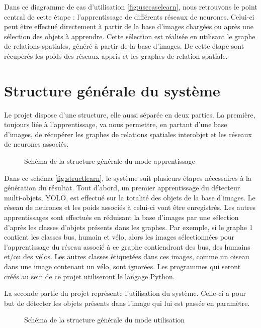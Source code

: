 \documentclass[debug,nodate,hideweeklyreports]{polytech/polytech}
\begin{document}
Dans ce diagramme de cas d’utilisation \autoref{fig:usecaselearn}, nous retrouvons le point central de cette étape : l’apprentissage de différents réseaux de neurones. Celui-ci peut être effectué directement à partir de la base d’images chargées ou après une sélection des objets à apprendre. Cette sélection est réalisée en utilisant le graphe de relations spatiales, généré à partir de la base d’images. De cette étape sont récupérés les poids des réseaux appris et les graphes de relation spatiale.

\section{Structure générale du système}

Le projet dispose d’une structure, elle aussi séparée en deux parties.
La première, toujours liée à l’apprentissage, va nous permettre, en partant d’une base d’images, de récupérer les graphes de relations spatiales interobjet et les réseaux de neurones associés.

\begin{figure}
  \caption{Schéma de la structure générale du mode apprentissage}
  \label{fig:structlearn}
\end{figure}

Dans ce schéma \autoref{fig:structlearn}, le système suit plusieurs étapes nécessaires à la génération du résultat. 
Tout d’abord, un premier apprentissage du détecteur multi-objets, YOLO, est effectué sur la totalité des objets de la base d’images. Le réseau de neurones et les poids associés à celui-ci vont être enregistrés.
Les autres apprentissages sont effectués en réduisant la base d’images par une sélection d’après les classes d’objets présents dans les graphes.
Par exemple, si le graphe 1 contient les classes bus, humain et vélo, alors les images sélectionnées pour l’apprentissage du réseau associé à ce graphe contiendront des bus, des humains et/ou des vélos. Les autres classes étiquetées dans ces images, comme un oiseau dans une image contenant un vélo, sont ignorées.
Les programmes qui seront créés au sein de ce projet utiliseront le langage Python.

La seconde partie du projet représente l’utilisation du système. Celle-ci a pour but de détecter les objets présents dans l’image qui lui est passée en paramètre.

\begin{figure}
  \caption{Schéma de la structure générale du mode utilisation}
  \label{fig:structuse}
\end{figure}
\end{document}
